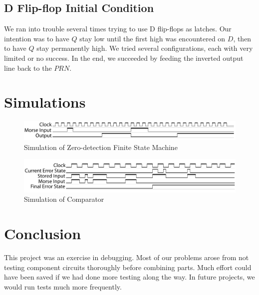 \documentclass[11pt,letterpaper,titlepage]{article}
\begin{document}
\subsection{D Flip-flop Initial Condition}
We ran into trouble several times trying to use D flip-flops as latches. Our intention was to have $Q$ stay low until the first high was encountered on $D$, then to have $Q$ stay permanently high. We tried several configurations, each with very limited or no success. In the end, we succeeded by feeding the inverted output line back to the $PRN$. 



\section{Simulations}

\begin{figure}[!htb]
	\begin{center}
		\includegraphics[width=5in]{graphics/sim/fsmsimulation.pdf}
		\caption{Simulation of Zero-detection Finite State Machine}
		\label{fig:FSMSim}
	\end{center}
\end{figure}


\begin{figure}[!htb]
	\begin{center}
		\includegraphics[width=5in]{graphics/sim/comparatorsimulation.pdf}
		\caption{Simulation of Comparator}
		\label{fig:CompSim}
	\end{center}
\end{figure}


\section{Conclusion}
This project was an exercise in debugging. Most of our problems arose from not testing component circuits thoroughly before combining parts. Much effort could have been saved if we had done more testing along the way. In future projects, we would run tests much more frequently.
\end{document}

